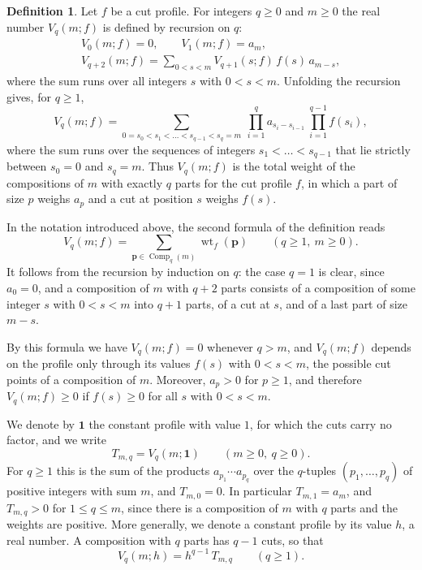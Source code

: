 \documentclass{amsart}
\theoremstyle{definition}
\newtheorem{definition}[theorem]{Definition}
\theoremstyle{remark}
\numberwithin{equation}{section}
\begin{document}
\begin{definition}\label{def:compositions}
Let $f$ be a cut profile. For integers $q\ge 0$ and $m\ge 0$ the real number $V_q(m;f)$ is defined by recursion on $q$:
\begin{gather*}
V_0(m;f)=0,\qquad V_1(m;f)=a_m,\\
V_{q+2}(m;f)=\sum_{0<s<m}V_{q+1}(s;f)\,f(s)\,a_{m-s},
\end{gather*}
where the sum runs over all integers $s$ with $0<s<m$. Unfolding the recursion gives, for $q\ge 1$,
\[
V_q(m;f)=\sum_{0=s_0<s_1<\dots<s_{q-1}<s_q=m}\ \prod_{i=1}^{q}a_{s_i-s_{i-1}}\ \prod_{i=1}^{q-1}f(s_i),
\]
where the sum runs over the sequences of integers $s_1<\dots<s_{q-1}$ that lie strictly between $s_0=0$ and $s_q=m$. Thus $V_q(m;f)$ is the total weight of the compositions of $m$ with exactly $q$ parts for the cut profile $f$, in which a part of size $p$ weighs $a_p$ and a cut at position $s$ weighs $f(s)$.
\end{definition}

In the notation introduced above, the second formula of the definition reads
\begin{equation}\label{eq:comps-total}
V_q(m;f)=\sum_{\mathbf p\in\operatorname{Comp}_q(m)}\operatorname{wt}_f(\mathbf p)\qquad(q\ge 1,\ m\ge 0).
\end{equation}
It follows from the recursion by induction on $q$: the case $q=1$ is clear, since $a_0=0$, and a composition of $m$ with $q+2$ parts consists of a composition of some integer $s$ with $0<s<m$ into $q+1$ parts, of a cut at $s$, and of a last part of size $m-s$.

By this formula we have $V_q(m;f)=0$ whenever $q>m$, and $V_q(m;f)$ depends on the profile only through its values $f(s)$ with $0<s<m$, the possible cut points of a composition of $m$. Moreover, $a_p>0$ for $p\ge 1$, and therefore $V_q(m;f)\ge 0$ if $f(s)\ge 0$ for all $s$ with $0<s<m$.

We denote by $\mathbf 1$ the constant profile with value $1$, for which the cuts carry no factor, and we write
\[
T_{m,q}=V_q(m;\mathbf 1)\qquad(m\ge 0,\ q\ge 0).
\]
For $q\ge 1$ this is the sum of the products $a_{p_1}\cdots a_{p_q}$ over the $q$-tuples $(p_1,\dots,p_q)$ of positive integers with sum $m$, and $T_{m,0}=0$. In particular $T_{m,1}=a_m$, and $T_{m,q}>0$ for $1\le q\le m$, since there is a composition of $m$ with $q$ parts and the weights are positive. More generally, we denote a constant profile by its value $h$, a real number. A composition with $q$ parts has $q-1$ cuts, so that
\begin{equation}\label{eq:comps-constant}
V_q(m;h)=h^{q-1}\,T_{m,q}\qquad(q\ge 1).
\end{equation}
\end{document}
